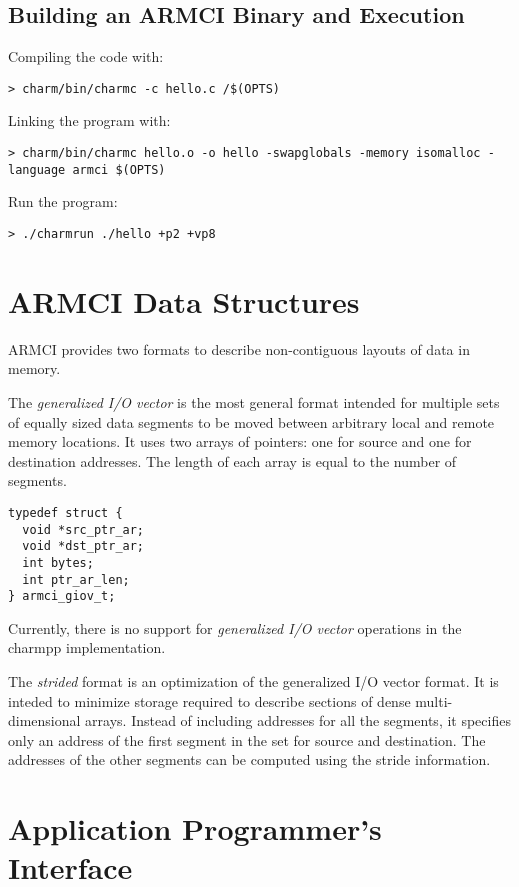 \documentclass[10pt]{article}
\begin{document}
\subsection{Building an ARMCI Binary and Execution}
\label{sec::armci build}

Compiling the code with:
\begin{verbatim}
> charm/bin/charmc -c hello.c /$(OPTS)
\end{verbatim}

\noindent
Linking the program with:
\begin{verbatim}
> charm/bin/charmc hello.o -o hello -swapglobals -memory isomalloc -language armci $(OPTS)
\end{verbatim}

\noindent
Run the program:
\begin{verbatim}
> ./charmrun ./hello +p2 +vp8
\end{verbatim}

\section{ARMCI Data Structures}
\label{sec::data structures}

ARMCI provides two formats to describe non-contiguous layouts of data
in memory.

The {\em generalized I/O vector} is the most general format intended
for multiple sets of equally sized data segments to be moved between
arbitrary local and remote memory locations. It uses two arrays of
pointers: one for source and one for destination addresses. The length
of each array is equal to the number of segments.

\begin{verbatim}
typedef struct {
  void *src_ptr_ar;
  void *dst_ptr_ar;
  int bytes;
  int ptr_ar_len;
} armci_giov_t;
\end{verbatim}

Currently, there is no support for {\em generalized I/O vector}
operations in the charmpp{} implementation.

The {\em strided} format is an optimization of the generalized I/O
vector format. It is inteded to minimize storage required to describe
sections of dense multi-dimensional arrays. Instead of including
addresses for all the segments, it specifies only an address of the
first segment in the set for source and destination. The addresses of
the other segments can be computed using the stride information.

\section{Application Programmer's Interface}
\label{sec::api}
\end{document}
